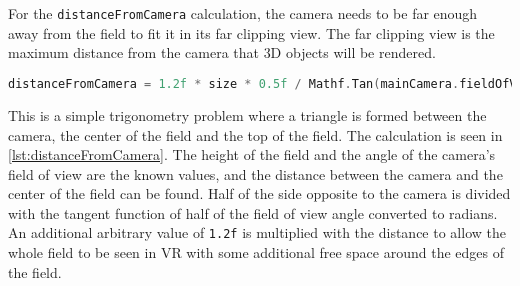 \\\\
For the \texttt{distanceFromCamera} calculation, the camera needs to be far enough away from the field to fit it in its far clipping view.
The far clipping view is the maximum distance from the camera that 3D objects will be rendered.
\begin{lstlisting}[caption={Calculation of the distance between the camera and field.}, captionpos=b,language=C,label={lst:distanceFromCamera}]
    distanceFromCamera = 1.2f * size * 0.5f / Mathf.Tan(mainCamera.fieldOfView * 0.5f * Mathf.Deg2Rad);
\end{lstlisting}
This is a simple trigonometry problem where a triangle is formed between the camera, the center of the field and the top of the field.
The calculation is seen in \autoref{lst:distanceFromCamera}.
The height of the field and the angle of the camera's field of view are the known values, and the distance between the camera and the center of the field can be found.
Half of the side opposite to the camera is divided with the tangent function of half of the field of view angle converted to radians.
An additional arbitrary value of \texttt{1.2f} is multiplied with the distance to allow the whole field to be seen in VR with some additional free space around the edges of the field.
